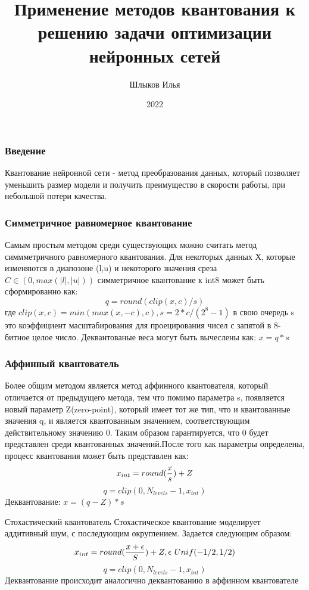 \documentclass{beamer}
\title{Применение методов квантования к решению задачи оптимизации нейронных сетей}
\author{Шлыков Илья}
\date{2022}
\begin{document}
\frame{\titlepage}

\begin{frame}
\frametitle{Введение}
 Квантование нейронной сети - метод преобразования данных, который позволяет уменьшить размер модели и получить преимущество в скорости работы, при небольшой потери качества.
\end{frame}

\begin{frame}
\frametitle{Симметричное равномерное квантование}
Самым простым методом среди существующих можно считать метод симмметричного равномерного квантования. Для некоторых данных Х, которые изменяются в диапозоне (l,u) и некоторого значения среза $C \in (0,max(|l|,|u|))  $ симметричное квантование к int8 может быть сформированно как:  
\begin{equation}
    q = round(clip(x,c)/s)
\end{equation}
где $clip(x,c) = min(max(x,-c),c),s = 2*c/(2^{8}-1)$
в свою очередь s это коэффициент масштабирования для проецирования чисел с запятой в 8-битное целое число. Деквантованые веса могут быть вычеслены как:  
$x = q*s$
\end{frame}

\begin{frame}
\frametitle{Аффинный квантователь}
Более общим методом является метод аффинного квантователя, который отличается от предыдущего метода, тем что помимо параметра s, появляется новый параметр Z(zero-point), который имеет тот же тип, что и квантованные значения q, и является квантованным значением, соответствующим действительному значению 0. Таким образом гарантируется, что 0 будет представлен среди квантованных значений.После того как параметры определены, процесс квантования может быть представлен как:
\begin{equation}
    x_{int} = round({x \over s}) + Z
\end{equation}
\begin{equation}
    q = clip(0,N_{levels}-1,x_{int})
\end{equation}
Деквантование: $x = (q - Z)*s$
\end{frame}

\begin{frame}{Стохастический квантователь}
    Стохастическое квантование моделирует аддитивный шум, с последующим округлением. Задается следующим образом:
    \begin{equation}
        x_{int} = round({x + \epsilon \over S}) + Z, \epsilon ~ Unif(-1/2,1/2)   
    \end{equation}
    \begin{equation}
    q = clip(0,N_{levels}-1,x_{int})
    \end{equation}
    Деквантование происходит аналогично деквантованию в аффинном квантователе
\end{frame}
\end{document}
